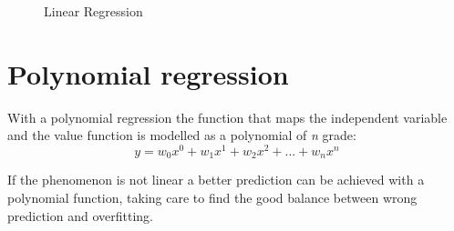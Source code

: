 \documentclass[10pt,a4paper]{article}
\begin{document}
	\begin{figure}%
	\centering
	\qquad\qquad
	\caption{Linear Regression\label{fig:Linear regression}}
	\end{figure}
	
	\newpage
	\section{Polynomial regression}
	With a polynomial regression the function that maps the independent variable and the value function is modelled as a polynomial of \emph{n} grade:
	\begin{equation}
		y = w_0 x^0 + w_1 x^1 + w_2 x^2 + ... + w_n x^n
	\end{equation}
	
	If the phenomenon is not linear a better prediction can be achieved with a polynomial function, taking care to find the good balance between wrong prediction and overfitting.
	
\end{document}
